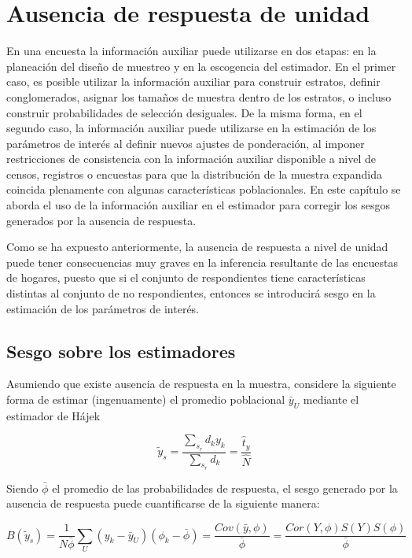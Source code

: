 \documentclass[
  12pt,
]{book}
\begin{document}
\hypertarget{ausencia-de-respuesta-de-unidad}{%
\chapter{Ausencia de respuesta de unidad}\label{ausencia-de-respuesta-de-unidad}}

En una encuesta la información auxiliar puede utilizarse en dos etapas: en la planeación del diseño de muestreo y en la escogencia del estimador. En el primer caso, es posible utilizar la información auxiliar para construir estratos, definir conglomerados, asignar los tamaños de muestra dentro de los estratos, o incluso construir probabilidades de selección desiguales. De la misma forma, en el segundo caso, la información auxiliar puede utilizarse en la estimación de los parámetros de interés al definir nuevos ajustes de ponderación, al imponer restricciones de consistencia con la información auxiliar disponible a nivel de censos, registros o encuestas para que la distribución de la muestra expandida coincida plenamente con algunas características poblacionales. En este capítulo se aborda el uso de la información auxiliar en el estimador para corregir los sesgos generados por la ausencia de respuesta.

Como se ha expuesto anteriormente, la ausencia de respuesta a nivel de unidad puede tener consecuencias muy graves en la inferencia resultante de las encuestas de hogares, puesto que si el conjunto de respondientes tiene características distintas al conjunto de no respondientes, entonces se introducirá sesgo en la estimación de los parámetros de interés.

\hypertarget{sesgo-sobre-los-estimadores}{%
\section{Sesgo sobre los estimadores}\label{sesgo-sobre-los-estimadores}}

Asumiendo que existe ausencia de respuesta en la muestra, considere la siguiente forma de estimar (ingenuamente) el promedio poblacional \(\bar{y}_U\) mediante el estimador de Hájek

\[
\tilde{y}_s = \frac{\sum_{s_r}d_ky_k}{\sum_{s_r}d_k} = \frac{\hat{t}_y}{\hat{N}}
\]

Siendo \(\bar{\phi}\) el promedio de las probabilidades de respuesta, el sesgo generado por la ausencia de respuesta puede cuantificarse de la siguiente manera:

\[
B\left(\tilde{y}_s\right)  = 
\frac{1}{N\bar{\phi}}\sum_U(y_k-\bar{y}_U)(\phi_k-\bar{\phi})
= \frac{Cov\left(\bar{y},\phi\right)}{\bar{\phi}}
= \frac{Cor\left(Y,\phi\right)S\left(Y\right)S\left(\phi\right)}{\bar{\phi}}
\]
\end{document}
